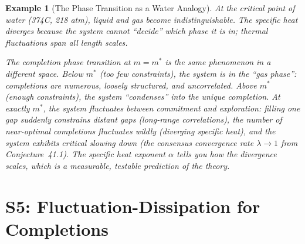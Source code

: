 \documentclass[11pt,letterpaper]{article}
\newtheorem{example}[conjecture]{Example}
\begin{document}
\begin{example}[The Phase Transition as a Water Analogy]
At the critical point of water (374\textdegree C, 218 atm), liquid and gas 
become indistinguishable. The specific heat diverges because the system 
cannot ``decide'' which phase it is in; thermal fluctuations span all 
length scales.

The completion phase transition at $m = m^*$ is the same phenomenon in a 
different space. Below $m^*$ (too few constraints), the system is in the 
``gas phase'': completions are numerous, loosely structured, and 
uncorrelated. Above $m^*$ (enough constraints), the system ``condenses'' 
into the unique completion. At exactly $m^*$, the system fluctuates between 
commitment and exploration: filling one gap suddenly constrains distant 
gaps (long-range correlations), the number of near-optimal completions 
fluctuates wildly (diverging specific heat), and the system exhibits 
critical slowing down (the consensus convergence rate $\lambda \to 1$ 
from Conjecture~41.1). The specific heat exponent $\alpha$ tells you 
\emph{how} the divergence scales, which is a measurable, testable 
prediction of the theory.
\end{example}

\newpage
\section{S5: Fluctuation-Dissipation for Completions}
\end{document}
